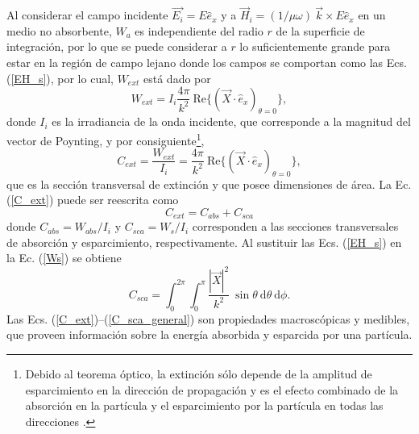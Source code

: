 Al considerar el campo incidente $\Vec{E_i}=E\hat{e}_x$ y a $\Vec{H}_i=(1/\mu \omega)\: \Vec{k} \times E \hat{e}_x$ en un medio no absorbente, $W_a$ es independiente del radio $r$ de la superficie de integración, por lo que se puede considerar a $r$ lo suficientemente grande para estar en la región de campo lejano donde los campos se comportan como las Ecs. (\ref{EH_s}), por lo cual, $W_{ext}$ está dado por \cite{bohrenAbsorptionScatteringLight2008}
%
\begin{equation*}
	W_{ext}=I_i\frac{4\pi}{k^2}\:\text{Re}\{(\Vec{X}\cdot\hat{e}_x)_{\theta=0}\},
\end{equation*}
%
donde $I_i$ es la irradiancia de la onda incidente, que corresponde a la magnitud del vector de Poynting, y por consiguiente\footnote{Debido al teorema óptico, la extinción sólo depende de la amplitud de esparcimiento en la dirección de propagación y es el efecto combinado de la absorción en la partícula y el esparcimiento por la partícula en todas las direcciones \cite{bohrenAbsorptionScatteringLight2008}.},
%
\begin{equation}
	C_{ext}=\frac{W_{ext}}{I_i}=\frac{4\pi}{k^2}\:\text{Re}\{(\Vec{X}\cdot\hat{e}_x)_{\theta=0}\}, \label{C_ext}
\end{equation}
%
que es la sección transversal de extinción y que posee dimensiones de área. La Ec. (\ref{C_ext}) puede ser reescrita como \cite{bohrenAbsorptionScatteringLight2008}
%
\begin{equation}
	C_{ext}=C_{abs}+C_{sca}
	\label{C}
\end{equation}
%
donde $C_{abs}=W_{abs}/I_i$ y $C_{sca}=W_s/I_i$ corresponden a las secciones transversales de absorción y esparcimiento, respectivamente. Al sustituir las Ecs. (\ref{EH_s}) en la Ec. (\ref{Ws}) se obtiene
%
\begin{equation}
	C_{sca}=\int_0^{2\pi}\int_0^{\pi}\frac{|\Vec{X}|^2}{k^2}\:\sin\theta\: \text{d}\theta\:\text{d}\phi.
	\label{C_sca_general}
\end{equation}
Las Ecs. (\ref{C_ext})--(\ref{C_sca_general}) son propiedades macroscópicas y medibles, que proveen información sobre la energía absorbida y esparcida por una partícula.  \\

